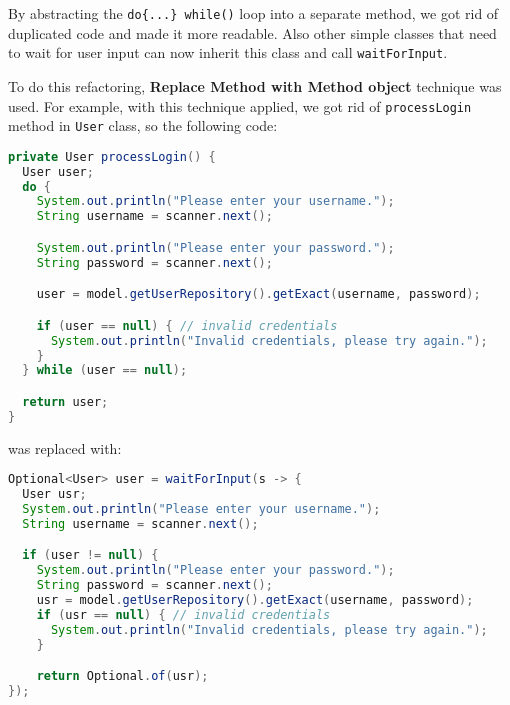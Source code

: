 \documentclass{article}
\renewcommand{\b}[1]{\textbf{#1}}
\newcommand{\code}[1]{\texttt{#1}}
\begin{document}
By abstracting the \code{do\{...\} while()} loop into a separate method, we got rid of duplicated code and made it more readable. Also other simple classes that need to wait for user input can now inherit this class and call \code{waitForInput}.

To do this refactoring, \b{Replace Method with Method object} technique was used. For example, with this technique applied, we got rid of \code{processLogin} method in \code{User} class, so the following code:

\begin{lstlisting}[language=Java]
private User processLogin() {
  User user;
  do {
    System.out.println("Please enter your username.");
    String username = scanner.next();

    System.out.println("Please enter your password.");
    String password = scanner.next();

    user = model.getUserRepository().getExact(username, password);

    if (user == null) { // invalid credentials
      System.out.println("Invalid credentials, please try again.");
    }
  } while (user == null);

  return user;
}
\end{lstlisting}

\noindent was replaced with:
\begin{lstlisting}[language=Java]
Optional<User> user = waitForInput(s -> {
  User usr;
  System.out.println("Please enter your username.");
  String username = scanner.next();

  if (user != null) {
    System.out.println("Please enter your password.");
    String password = scanner.next();
    usr = model.getUserRepository().getExact(username, password);
    if (usr == null) { // invalid credentials
      System.out.println("Invalid credentials, please try again.");
    }

    return Optional.of(usr);
});
\end{lstlisting}
\end{document}
